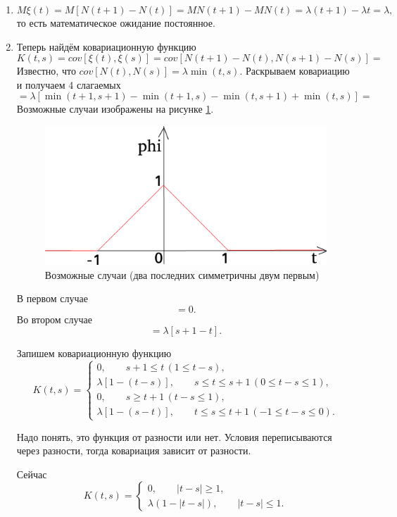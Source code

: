 \begin{enumerate}
  \item
  $$M \xi \left( t \right) =
    M \left[ N \left( t + 1 \right) - N \left( t \right) \right] =
    MN \left( t + 1 \right) - MN \left( t \right) =
    \lambda \left( t + 1 \right) - \lambda t =
    \lambda,$$
  то есть математическое ожидание постоянное.
  \item Теперь найдём ковариационную функцию
  $$K \left( t, s \right) =
    cov \left[ \xi \left( t \right), \xi \left( s \right) \right] =
    cov \left[
      N \left( t + 1 \right) - N \left( t \right),
      N \left( s + 1 \right) - N \left( s \right) \right] =$$
  Известно, что
  $cov \left[ N \left( t \right), N \left( s \right) \right] =
    \lambda \min \left( t, s \right) $.
  Раскрываем ковариацию и получаем 4 слагаемых
  $$= \lambda \left[
      \min \left( t + 1, s + 1 \right) - \min \left( t + 1, s \right) -
      \min \left( t, s + 1 \right) + \min \left( t, s \right) \right] =$$
  Возможные случаи изображены на рисунке \ref{fig:83}.

  \begin{figure}[h!]
    \centering
    \includegraphics[width=.4\textwidth]{./pictures/4_2.png}
    \caption{Возможные случаи (два последних симметричны двум первым)}
    \label{fig:83}
  \end{figure}

  В первом случае
  $$= 0.$$
  Во втором случае
  $$= \lambda \left[ s + 1 - t \right].$$

  Запишем ковариационную функцию
  $$K \left( t, s \right) =
    \begin{cases}
      0, \qquad s + 1 \leq t \, \left( 1 \leq t - s \right), \\
      \lambda \left[ 1 - \left( t - s \right) \right],
      \qquad s \leq t \leq s + 1 \, \left( 0 \leq t - s \leq 1 \right), \\
      0, \qquad s \geq t + 1 \, \left( t - s \leq 1 \right), \\
      \lambda \left[ 1 - \left( s - t \right) \right],
      \qquad t \leq s \leq t + 1 \, \left( -1 \leq t - s \leq 0 \right).
    \end{cases}$$

  Надо понять, это функция от разности или нет.
  Условия переписываются через разности, тогда ковариация зависит от разности.

  Сейчас
  $$K \left( t, s \right) =
    \begin{cases}
      0, \qquad \left| t - s \right| \geq 1, \\
      \lambda \left( 1 - \left| t - s \right| \right), \qquad \left| t - s \right| \leq 1.
    \end{cases}$$
\end{enumerate}

